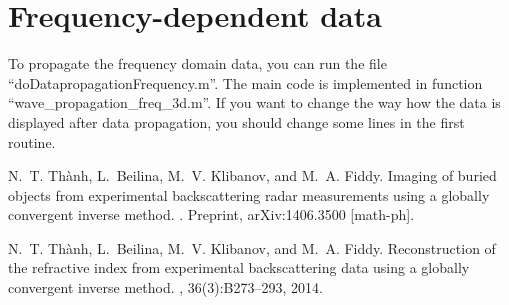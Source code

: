 \documentclass[a4paper,12pt]{article}
\begin{document}
\section{Frequency-dependent data}

To propagate the frequency domain data, you can run the file ``doDatapropagationFrequency.m''. The main code is implemented in function ``wave\_propagation\_freq\_3d.m''. If you want to change the way how the data is displayed after data propagation, you should change some lines in the first routine. 



% 
% 
\begin{thebibliography}{1}

N.~T. Th\`anh, L.~Beilina, M.~V. Klibanov, and M.~A. Fiddy.
\newblock Imaging of buried objects from experimental backscattering radar
  measurements using a globally convergent inverse method.
.
\newblock Preprint, arXiv:1406.3500 [math-ph].

N.~T. Th\`anh, L.~Beilina, M.~V. Klibanov, and M.~A. Fiddy.
\newblock Reconstruction of the refractive index from experimental
  backscattering data using a globally convergent inverse method.
, 36(3):B273--293, 2014.

\end{thebibliography}
\end{document}
